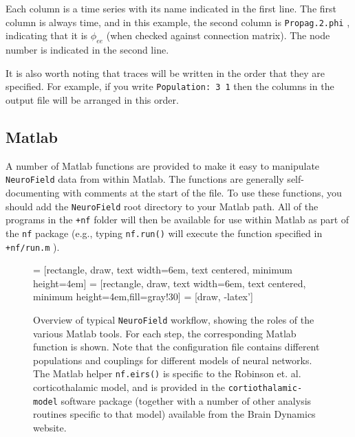 \documentclass[12pt,a4paper]{article}
\newcommand{\type}[1]{{\small\small\tt #1} }
\newcommand{\NF}[0]{\type{NeuroField}}
\begin{document}
Each column is a time series with its name indicated in the first line. The first column is always time, and in this example, the second column is \type{Propag.2.phi}, indicating that it is $\phi_{ee}$ (when checked against connection matrix). The node number is indicated in the second line.

It is also worth noting that traces will be written in the order that they are specified. For example, if you write \type{Population: 3 1} then the columns in the output file will be arranged in this order. 

\subsection{Matlab}
A number of Matlab functions are provided to make it easy to manipulate \NF data from within Matlab. The functions are generally self-documenting with comments at the start of the file. To use these functions, you should add the \NF root directory to your Matlab path. All of the programs in the \type{+nf} folder will then be available for use within Matlab as part of the \type{nf} package (e.g., typing \type{nf.run()} will execute the function specified in \type{+nf/run.m}).

\begin{figure}[b]
\begin{center}
 = [rectangle, draw, text width=6em, text centered, minimum height=4em]
 = [rectangle, draw, text width=6em, text centered, minimum height=4em,fill=gray!30]
 = [draw, -latex']    
\caption{Overview of typical \NF workflow, showing the roles of the various Matlab tools. For each step, the corresponding Matlab function is shown. Note that the configuration file contains different populations and couplings for different models of neural networks. The Matlab helper \type{nf.eirs()} is specific to the Robinson et. al. corticothalamic model, and is provided in the \type{cortiothalamic-model} software package (together with a number of other analysis routines specific to that model) available from the Brain Dynamics website.}
\label{fig:components}
\end{center}
\end{figure}
\end{document}
